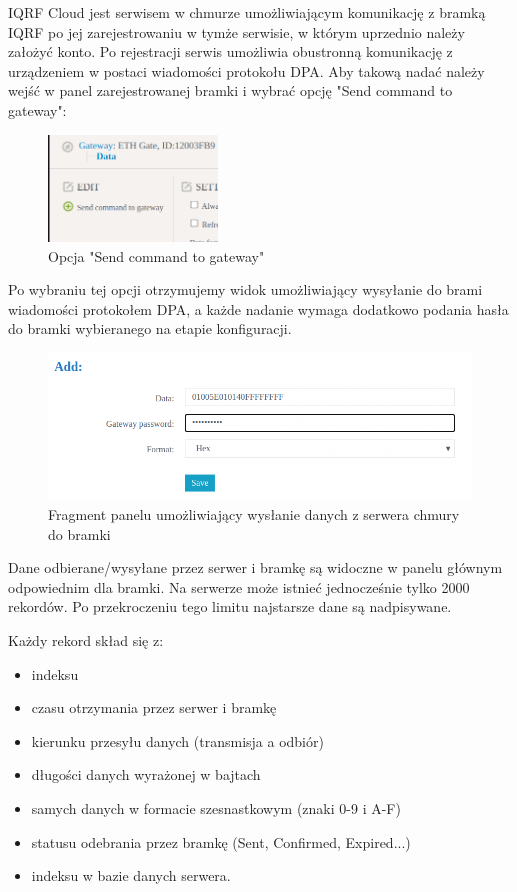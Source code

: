 \documentclass[a4paper, 12pt]{article}
\begin{document}
IQRF Cloud jest serwisem w chmurze umożliwiającym komunikację z bramką IQRF po jej zarejestrowaniu w tymże serwisie, w którym uprzednio należy
założyć konto. Po rejestracji serwis umożliwia obustronną komunikację z urządzeniem w postaci wiadomości protokołu DPA. Aby takową nadać należy 
wejść w panel zarejestrowanej bramki i wybrać opcję "Send command to gateway":

\begin{figure}[H]
    \centering
    \includegraphics[width=0.4\textwidth]{zdj/send-command-to-gw.png}
    \caption{Opcja "Send command to gateway"}
\end{figure}

Po wybraniu tej opcji otrzymujemy widok umożliwiający wysyłanie do brami wiadomości protokołem DPA, a każde nadanie wymaga dodatkowo podania
hasła do bramki wybieranego na etapie konfiguracji.

\begin{figure}[H]
    \includegraphics[width=\textwidth]{zdj/cloud-send-message.png}
    \caption{Fragment panelu umożliwiający wysłanie danych z serwera chmury do bramki}
\end{figure}

Dane odbierane/wysyłane przez serwer i bramkę są widoczne w panelu głównym odpowiednim dla bramki. Na serwerze może istnieć jednocześnie tylko 2000
rekordów. Po przekroczeniu tego limitu najstarsze dane są nadpisywane.

Każdy rekord skład się z:
\begin{itemize}
    \item indeksu 
    \item czasu otrzymania przez serwer i bramkę
    \item kierunku przesyłu danych (transmisja a odbiór)
    \item długości danych wyrażonej w bajtach 
    \item samych danych w formacie szesnastkowym (znaki 0-9 i A-F)
    \item statusu odebrania przez bramkę (Sent, Confirmed, Expired...)
    \item indeksu w bazie danych serwera.
\end{itemize}
\end{document}
